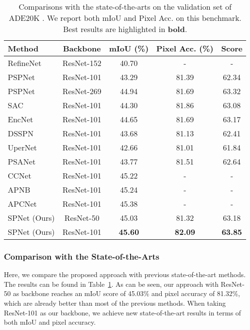 \documentclass[final]{cvpr}
\begin{document}
\begin{table}[tp!]
  \centering
  \small
  \setlength\tabcolsep{1.0mm}
  \renewcommand\arraystretch{1.0}
  \begin{tabular}{lcccc} \toprule[0.7pt]
    Method & Backbone & mIoU (\%) & Pixel Acc. (\%) & Score \\ \midrule[0.5pt]\midrule[0.5pt]
    RefineNet \cite{lin2017refinenet} & ResNet-152 & 40.70 & - & - \\
    PSPNet \cite{zhao2016pyramid} & ResNet-101 & 43.29 & 81.39 & 62.34\\
    PSPNet \cite{zhao2016pyramid} & ResNet-269 & 44.94 & 81.69 & 63.32 \\
    SAC \cite{zhang2017scale} & ResNet-101 & 44.30 & 81.86 & 63.08 \\
    EncNet \cite{zhang2018context} & ResNet-101 & 44.65 & 81.69 & 63.17 \\
    DSSPN \cite{liang2018dynamic} & ResNet-101 & 43.68 & 81.13 & 62.41 \\
    UperNet \cite{xiao2018unified} & ResNet-101 & 42.66 & 81.01 & 61.84 \\
    PSANet \cite{zhao2018psanet} & ResNet-101 & 43.77 & 81.51 & 62.64 \\
    CCNet \cite{huang2018ccnet} & ResNet-101 & 45.22 & - & - \\
    APNB \cite{zhu2019asymmetric} & ResNet-101 & 45.24 & - & - \\
    APCNet \cite{he2019adaptive} & ResNet-101 & 45.38 & - & - \\ \midrule[0.5pt]\midrule[0.5pt]
    SPNet (Ours) & ResNet-50 & 45.03 & 81.32 & 63.18 \\
    SPNet (Ours) & ResNet-101 & \textbf{45.60} & \textbf{82.09} & \textbf{63.85} \\
    \bottomrule[0.7pt]
  \end{tabular}
  \vspace{0pt}
  \caption{Comparisons with the state-of-the-arts on the 
  validation set of ADE20K \cite{zhou2017scene}. We report both mIoU and Pixel Acc. on this benchmark. Best results are highlighted in \textbf{bold}.}
  \label{tab:res_ade20k}
\end{table}

\subsubsection{Comparison with the State-of-the-Arts}

Here, we compare the proposed approach with previous state-of-the-art methods.
The results can be found in Table~\ref{tab:res_ade20k}.
As can be seen, our approach with ResNet-50 as backbone reaches an mIoU score of 45.03\% and pixel accuracy of 81.32\%,
which are already better than most of the previous methods.
When taking ResNet-101 as our backbone, we achieve new state-of-the-art
results in terms of both mIoU and pixel accuracy.
\end{document}
